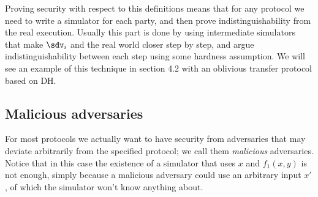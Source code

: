 Proving security with respect to this definitions means that for any protocol we need to write a simulator for each party, and then prove indistinguishability from the real execution. Usually this part is done by using intermediate simulators that make $\sdv_i$ and the real world closer step by step, and argue indistinguishability between each step using some hardness assumption. We will see an example of this technique in section 4.2 with an oblivious transfer protocol based on DH.  

\subsection{Malicious adversaries}



For most protocols we actually want to have security from adversaries that may deviate arbitrarily from the specified protocol; we call them \emph{malicious} adversaries. Notice that in this case the existence of a simulator that uses $x$ and $f_1(x,y)$ is not enough, simply because a malicious adversary could use an arbitrary input $x'$, of which the simulator won't know anything about.

